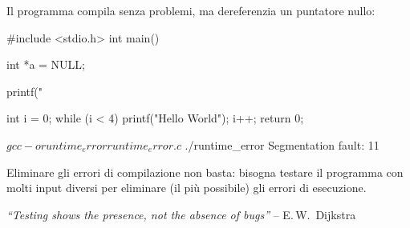 \documentclass[11pt,a4paper]{article}
\begin{document}
Il programma compila senza problemi, ma dereferenzia un puntatore nullo:
\begin{codice}
#include <stdio.h>
int main() {
    int *a = NULL;

    printf("%

    int i = 0;
    while (i < 4) {
        printf("Hello World");
        i++;
    }
    return 0;
}
\end{codice}
\begin{risultato}
$ gcc -o runtime_error runtime_error.c
$ ./runtime_error
Segmentation fault: 11
\end{risultato}

\begin{osservazione}
Eliminare gli errori di compilazione non basta: bisogna testare il programma
con molti input diversi per eliminare (il più possibile) gli errori di
esecuzione.
\end{osservazione}

\begin{center}
\emph{``Testing shows the presence, not the absence of bugs''} -- E.\,W.\ Dijkstra
\end{center}
\end{document}
